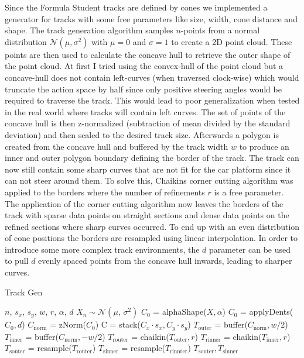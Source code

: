 Since the Formula Student tracks are defined by cones we implemented a generator for tracks with some free parameters like size, width, cone distance and shape.
The track generation algorithm samples $n$-points from a normal distribution $\mathcal{N}(\mu, \sigma^2)$ with $\mu = 0$ and $\sigma = 1$ to create a 2D point cloud. These points are then used to calculate the concave hull to retrieve the outer shape of the point cloud. At first I tried using the convex-hull of the point cloud but a concave-hull does not contain left-curves (when traversed clock-wise) which would truncate the action space by half since only positive steering angles would be required to traverse the track. This would lead to poor generalization when tested in the real world where tracks will contain left curves. The set of points of the concave hull is then z-normalized (subtraction of mean divided by the standard deviation) and then scaled to the desired track size.
Afterwards a polygon is created from the concave hull and buffered by the track width $w$ to produce an inner and outer polygon boundary defining the border of the track. The track can now still contain some sharp curves that are not fit for the car platform since it can not steer around them. To solve this, Chaikins corner cutting algorithm \cite{chaikin1974algorithm} was applied to the borders where the number of refinements $r$ is a free parameter.\\
\newline
The application of the corner cutting algorithm now leaves the borders of the track with sparse data points on straight sections and dense data points on the refined sections where sharp curves occurred. To end up with an even distribution of cone positions the borders are resampled using linear interpolation.
In order to introduce some more complex track environments, the $d$ parameter can be used to pull $d$ evenly spaced points from the concave hull inwards, leading to sharper curves.

\begin{algorithm}[tb]
\caption{Track Gen}
\label{alg:track-gen}
\begin{algorithmic}
 $n$, $s_x$, $s_y$, $w$, $r$, $\alpha$, $d$
\State $X_n \sim \mathcal{N}(\mu,\,\sigma^{2})$
\State $C_0$ = alphaShape($X, \alpha$)
\State $C_0$ = applyDents($C_0, d$)
\State $C_\text{norm}$ = zNorm($C_0$)
\State C = stack($C_x \cdot s_x, C_y \cdot s_y$)
\State $T_\text{outer}$ = buffer($C_\text{norm}, w/2$)
\State $T_\text{inner}$ = buffer($C_\text{norm}, -w/2$)
\State $T_\text{router}$ = chaikin($T_\text{outer}, r$)
\State $T_\text{rinner}$ = chaikin($T_\text{inner}, r$)
\State $T_\text{souter}$ = resample($T_\text{router}$)
\State $T_\text{sinner}$ = resample($T_\text{rinnter}$)
 $T_\text{souter}, T_\text{sinner}$
\end{algorithmic}
\end{algorithm}

